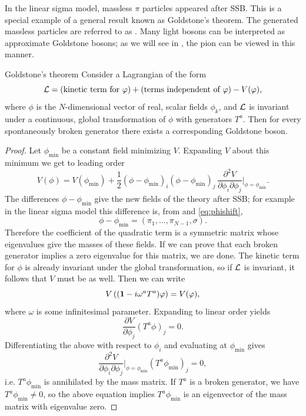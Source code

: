 In the linear sigma model, massless $\pi$ particles appeared after
SSB. This is a special example of a general result
known as Goldstone's theorem. The generated massless particles are
referred to as . 
Many light bosons can be interpreted
as approximate Goldstone bosons; as we will see in ,
the pion can be viewed in this manner.
\begin{theorem}{Goldstone's theorem}{}
Consider a Lagrangian of the form
$$
  \mathcal{L}=(\text{kinetic term for $\varphi$})+
        (\text{terms independent of $\varphi$})-V(\varphi),
$$
where $\phi$ is the $N$-dimensional vector of real, scalar fields
$\phi_k$, and $\mathcal{L}$ is invariant under a continuous, global
transformation of $\phi$ with generators $T^a$. Then for every
spontaneously broken generator there exists a corresponding
Goldstone boson. 
\begin{proof}
  Let $\phi_\text{min}$ be a constant field minimizing $V$. Expanding
  $V$ about this minimum we get to leading order
  $$
    V(\phi)= V(\phi_\text{min})
     +\frac{1}{2}
      (\phi-\phi_\text{min})_i(\phi-\phi_\text{min})_j\,
      \frac{\partial^2 V}{\partial\phi_i\partial\phi_j}
       \Big|_{\phi=\phi_\text{min}}.
  $$
  The differences $\phi-\phi_\text{min}$ give the new fields of the
  theory after SSB; for example in the linear sigma model this difference
  is, from  and \eqref{eq:phishift},
  $$
    \phi-\phi_\text{min}=(\pi_1,...,\pi_{N-1},\sigma).
  $$
  Therefore the coefficient of the quadratic term is a symmetric matrix
  whose eigenvalues give the masses of these fields. If we can prove
  that each broken generator implies a zero eigenvalue for this matrix,
  we are done.
  The kinetic term for $\phi$ is already invariant under the global
  transformation, so if $\mathcal{L}$ is invariant, it follows that $V$ must
  be as well. Then we can write
  $$
    V\left(({\mathbf 1}-i\omega^aT^a)\varphi\right)=V(\varphi),
  $$
  where $\omega$ is some infinitesimal parameter. Expanding to linear
  order yields
  $$
    \frac{\partial V}{\partial\phi_j}(T^a\phi)_j=0.
  $$
  Differentiating the above with respect to $\phi_i$ and evaluating at
  $\phi_\text{min}$ gives
  $$
     \frac{\partial^2 V}{\partial\phi_i\partial\phi_j}
      \Big|_{\phi=\phi_\text{min}}(T^a\phi_\text{min})_j=0,
  $$
  i.e. $T^a\phi_\text{min}$ is annihilated by the mass matrix. 
  If $T^a$ is a broken generator, we have $T^a\phi_\text{min}\neq0$,
  so the above equation implies $T^a\phi_\text{min}$ is an
  eigenvector of the mass matrix with eigenvalue zero.
\end{proof}
\end{theorem}

